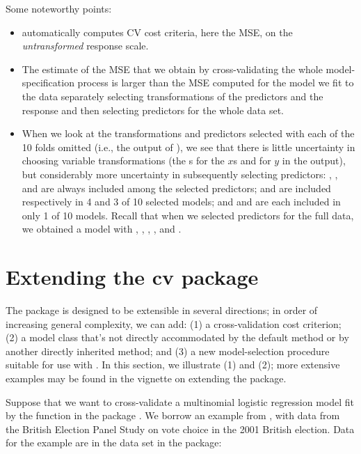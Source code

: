 \documentclass[
]{jss}
\providecommand{\tightlist}{%
  \setlength{\itemsep}{0pt}\setlength{\parskip}{0pt}}
\begin{document}
Some noteworthy points:

\begin{itemize}
\tightlist
\item
   automatically computes CV cost criteria,
  here the MSE, on the \emph{untransformed} response scale.
\item
  The estimate of the MSE that we obtain by cross-validating the whole
  model-specification process is larger than the MSE computed for the
  model we fit to the  data separately selecting
  transformations of the predictors and the response and then selecting
  predictors for the whole data set.
\item
  When we look at the transformations and predictors selected with each
  of the 10 folds omitted (i.e., the output of ),
  we see that there is little uncertainty in choosing variable
  transformations (the s for the \(x\)s and 
  for \(y\) in the output), but considerably more uncertainty in
  subsequently selecting predictors: , ,
  and  are always included among the selected predictors;
   and  are included respectively
  in 4 and 3 of 10 selected models; and  and
   are each included in only 1 of 10 models. Recall that
  when we selected predictors for the full data, we obtained a model
  with , , ,
  , and .
\end{itemize}

\hypertarget{extending-the-cv-package}{%
\section{Extending the cv package}\label{extending-the-cv-package}}

The  package is designed to be extensible in several directions;
in order of increasing general complexity, we can add: (1) a
cross-validation cost criterion; (2) a model class that's not directly
accommodated by the  default method or by another directly
inherited method; and (3) a new model-selection procedure suitable for
use with . In this section, we illustrate (1) and
(2); more extensive examples may be found in the vignette on extending
the  package.

Suppose that we want to cross-validate a multinomial logistic regression
model fit by the  function in the  package
\citep{VenablesRipley:2002}. We borrow an example from \citet[Sec.
14.2.1]{Fox:2016}, with data from the British Election Panel Study on
vote choice in the 2001 British election. Data for the example are in
the  data set in the  package:
\end{document}
